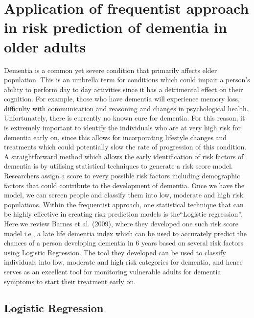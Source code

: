\documentclass[12pt,letterpaper]{article}
\begin{document}
\section{Application of frequentist approach in risk prediction of dementia in older adults}
Dementia is a common yet severe condition that primarily affects elder population. This is an umbrella term for conditions which could impair a person's ability to perform day to day activities since it has a detrimental effect on their cognition. For example, those who have dementia will experience memory loss, difficulty with communication and reasoning and changes in psychological health. Unfortunately, there is currently no known cure for dementia. For this reason, it is extremely important to identify the individuals who are at very high risk for dementia early on, since this allows for incorporating lifestyle changes and treatments which could potentially slow the rate of progression of this condition. A straightforward method which allows the early identification of risk factors of dementia is by utilising statistical techniques to generate a risk score model. Researchers assign a score to every possible risk factors including demographic factors that could contribute to the development of dementia. Once we have the model, we can screen people and classify them into low, moderate and high risk populations. Within the frequentist approach, one statistical technique that can be highly effective in creating risk prediction models is the``Logistic regression''. Here we review Barnes et al. (2009), where they developed one such risk score model i.e., a late life dementia index which can be used to accurately predict the chances of a person developing dementia in 6 years based on several risk factors using Logistic Regression. The tool they developed can be used to classify individuals into low, moderate and high risk categories for dementia, and hence serves as an excellent tool for monitoring vulnerable adults for dementia symptoms to start their treatment early on.  

\subsection{Logistic Regression}
\end{document}
